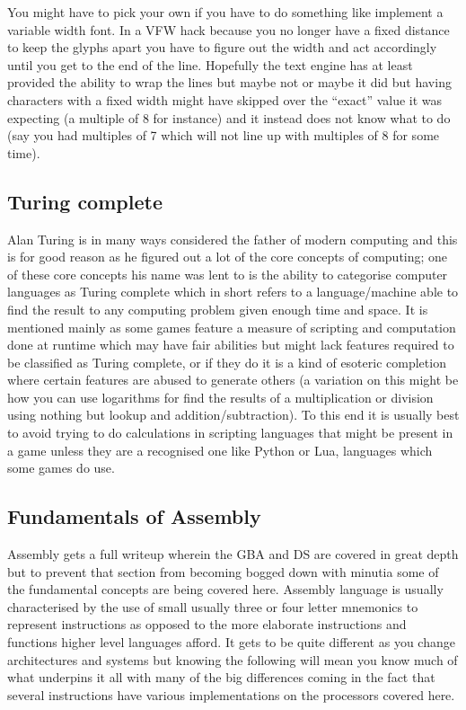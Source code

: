 \documentclass[
]{book}
\begin{document}
You might have to pick your own if you have to do something like implement a variable width font. In a VFW hack because you no longer have a fixed distance to keep the glyphs apart you have to figure out the width and act accordingly until you get to the end of the line. Hopefully the text engine has at least provided the ability to wrap the lines but maybe not or maybe it did but having characters with a fixed width might have skipped over the ``exact'' value it was expecting (a multiple of 8 for instance) and it instead does not know what to do (say you had multiples of 7 which will not line up with multiples of 8 for some time).

\hypertarget{turing-complete}{%
\subsection{Turing complete}\label{turing-complete}}

Alan Turing is in many ways considered the father of modern computing and this is for good reason as he figured out a lot of the core concepts of computing; one of these core concepts his name was lent to is the ability to categorise computer languages as Turing complete which in short refers to a language/machine able to find the result to any computing problem given enough time and space. It is mentioned mainly as some games feature a measure of scripting and computation done at runtime which may have fair abilities but might lack features required to be classified as Turing complete, or if they do it is a kind of esoteric completion where certain features are abused to generate others (a variation on this might be how you can use logarithms for find the results of a multiplication or division using nothing but lookup and addition/subtraction). To this end it is usually best to avoid trying to do calculations in scripting languages that might be present in a game unless they are a recognised one like Python or Lua, languages which some games do use.

\hypertarget{fundamentals-of-assembly}{%
\subsection{Fundamentals of Assembly}\label{fundamentals-of-assembly}}

Assembly gets a full writeup wherein the GBA and DS are covered in great depth but to prevent that section from becoming bogged down with minutia some of the fundamental concepts are being covered here. Assembly language is usually characterised by the use of small usually three or four letter mnemonics to represent instructions as opposed to the more elaborate instructions and functions higher level languages afford. It gets to be quite different as you change architectures and systems but knowing the following will mean you know much of what underpins it all with many of the big differences coming in the fact that several instructions have various implementations on the processors covered here.
\end{document}
